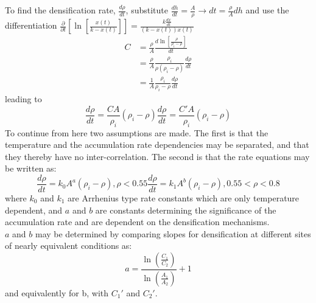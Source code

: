 \documentclass[11pt]{article}
\begin{document}
To find the densification rate, $\frac{d\rho}{dt}$, substitute $\frac{dh}{dt} = \frac{A}{\rho} \rightarrow dt = \frac{\rho}{A} dh$ and use the differentiation $\frac{\partial}{\partial t}\left[\ln\left[\frac{x(t)}{k - x(t)}\right]\right] = \frac{k \frac{dx}{dt}}{(k - x(t))x(t)}$
\begin{align*}
	C & = \frac{\rho}{A}\frac{d\ln\left[\frac{\rho}{\rho_i - \rho}\right]}{dt}\\
	& = \frac{\rho}{A} \frac{\rho_i}{\rho(\rho_i - \rho)}\frac{d\rho}{dt}\\
	& = \frac{1}{A}\frac{\rho_i}{\rho_i - \rho}\frac{d\rho}{dt}
\end{align*}
leading to 
\begin{subequations}
	\begin{equation}
		\frac{d\rho}{dt} = \frac{C A}{\rho_i}(\rho_i - \rho)
		\label{eq:Dens_Rate_1}
	\end{equation}
	\begin{equation}
		\frac{d\rho}{dt} = \frac{C' A}{\rho_i}(\rho_i - \rho)
		\label{eq:Dens_Rate_2}
	\end{equation}
\end{subequations}
To continue from here two assumptions are made. The first is that the temperature and the accumulation rate dependencies may be separated, and that they thereby have no inter-correlation. The second is that the rate equations may be written as:
\begin{subequations}
	\begin{equation}
		\frac{d\rho}{dt} = k_0 A^a (\rho_i - \rho), \rho < 0.55
		\label{eq:Dens_Rate_1_Arrh}
	\end{equation}
	\begin{equation}
		\frac{d\rho}{dt} = k_1 A^b (\rho_i - \rho), 0.55 < \rho < 0.8
		\label{eq:Dens_Rate_2_Arrh}
	\end{equation}
\end{subequations}
where $k_0$ and $k_1$ are Arrhenius type rate constants which are only temperature dependent, and $a$ and $b$ are constants determining the significance of the accumulation rate and are dependent on the densification mechanisms.\\
$a$ and $b$ may be determined by comparing slopes for densification at different sites of nearly equivalent conditions as:
\begin{equation}
	a = \frac{\ln\left(\frac{C_1}{C_2}\right)}{\ln\left(\frac{A_1}{A_2}\right)} + 1
	\label{eq:Determ_const_a}
\end{equation}
and equivalently for b, with $C_1'$ and $C_2'$.\\
\end{document}
